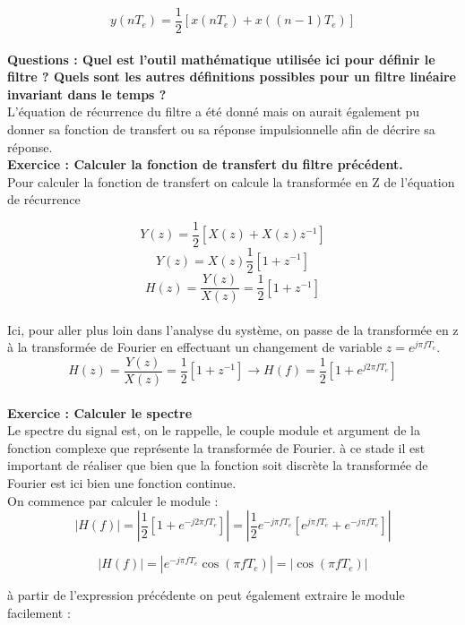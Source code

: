 \documentclass[11pt,a4paper]{article}
\begin{document}
\[ y(nT_e) = \frac{1}{2}[x(nT_e) + x((n-1)T_e)  ] \]\\

\textbf{Questions : Quel est l'outil mathématique utilisée ici pour définir le filtre ? Quels sont les autres définitions possibles pour un filtre linéaire invariant dans le temps ?  }\\

L'équation de récurrence du filtre a été donné mais on aurait également pu donner sa fonction de transfert ou sa réponse impulsionnelle afin de décrire sa réponse.\\

\textbf{Exercice : Calculer la fonction de transfert du filtre précédent. }\\

Pour calculer la fonction de transfert on calcule la transformée en Z de l'équation de récurrence 

\[ Y(z) = \frac{1}{2}[X(z) + X(z)z^{-1}  ] \]
\[ Y(z) = X(z)\frac{1}{2}[1 + z^{-1}  ] \]
\[ H(z) = \frac{Y(z)}{X(z)} = \frac{1}{2}[1 + z^{-1}  ] \]\\

Ici, pour aller plus loin dans l'analyse du système, on passe de la transformée en z à la transformée de Fourier  en effectuant un changement de variable $z = e^{j\pi f T_e}$. \\

\[ H(z) = \frac{Y(z)}{X(z)} = \frac{1}{2}[1 + z^{-1}  ] \rightarrow H(f) = \frac{1}{2}[1 + e^{j2\pi f T_e}]\]\\

\textbf{Exercice : Calculer le spectre}\\

Le spectre du signal est, on le  rappelle, le couple module et argument de la fonction complexe que représente la transformée de  Fourier. à ce stade il est important de réaliser que bien que la fonction soit discrète la transformée de Fourier est ici bien une fonction continue.\\

On commence par calculer le module :\\

\[ |H(f)| = |\frac{1}{2}[1 + e^{-j2\pi f T_e}]| = |\frac{1}{2}e^{-j\pi f T_e}[e^{j\pi f T_e} + e^{-j\pi f T_e}]|   \]

\[ |H(f)| = |e^{-j\pi f T_e}\cos(\pi f T_e)|  = |\cos(\pi f T_e)|   \]

à partir de l'expression précédente on peut également extraire le module facilement : 
\end{document}
